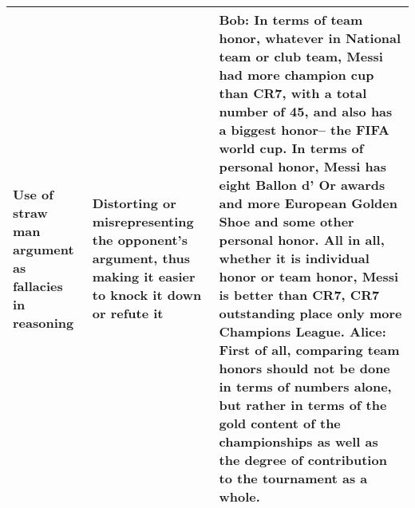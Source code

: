 \begin{table*}[h!]
\begin{tabular}{>{\raggedright\arraybackslash}p{2.5cm}>{\raggedright\arraybackslash}p{4cm}>{\raggedright\arraybackslash}p{9.5cm}}
    \hline
    Use of straw man argument as fallacies in reasoning & Distorting or misrepresenting the opponent's argument, thus making it easier to knock it down or refute it ~\cite{van_eemeren_argumentation_2016} & Bob: In terms of team honor, whatever in National team or club team, Messi had more champion cup than CR7, with a total number of 45, and also has a biggest honor-- the FIFA world cup. In terms of personal honor, Messi has eight Ballon d' Or awards and more European Golden Shoe and some other personal honor. All in all, whether it is individual honor or team honor, Messi is better than CR7, CR7 outstanding place only more Champions League. \textbf{Alice: First of all, comparing team honors should not be done in terms of numbers alone, but rather in terms of the gold content of the championships as well as the degree of contribution to the tournament as a whole.} \\
    \bottomrule
  \end{tabular}
\end{table*}

\clearpage
